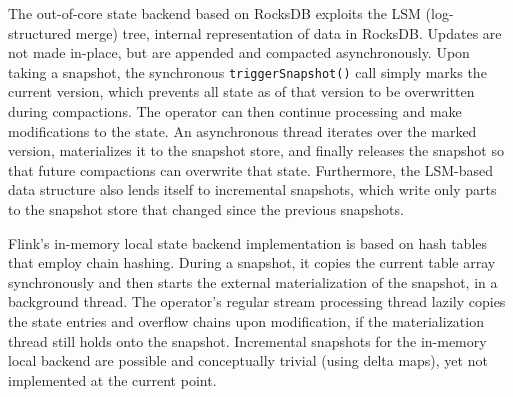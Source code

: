 
The out-of-core state backend based on RocksDB \cite{CUSTOM:web/rocksdb} exploits the LSM (log-structured merge) tree, internal representation of data in RocksDB. 
Updates are not made in-place, but are appended and compacted asynchronously. Upon taking a snapshot, the synchronous \texttt{triggerSnapshot()} call simply marks the current version, which prevents all state as of that version to be overwritten during compactions. The operator can then continue processing and make modifications to the state. An asynchronous thread iterates over the marked version, materializes it to the snapshot store, and finally releases the snapshot so that future compactions can overwrite that state. Furthermore, the LSM-based data structure also lends itself to incremental snapshots, which write only parts to the snapshot store that changed since the previous snapshots.

Flink's in-memory local state backend implementation is based on hash tables that employ chain hashing. During a snapshot, it copies the current table array synchronously and then starts the external materialization of the snapshot, in a background thread. The operator's regular stream processing thread lazily copies the state entries and overflow chains upon modification, if the materialization thread still holds onto the snapshot. Incremental snapshots for the in-memory local backend are possible and conceptually trivial (using delta maps), yet not implemented at the current point. 

